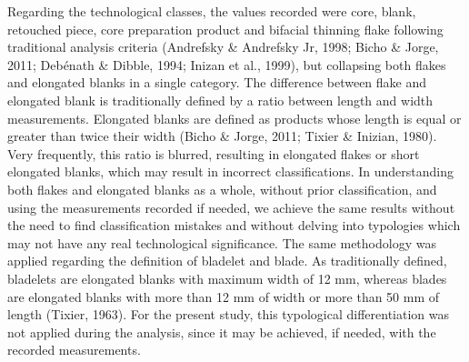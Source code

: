 \documentclass[12pt,twoside]{reedthesis}
\begin{document}
Regarding the technological classes, the values recorded were core, blank, retouched piece, core preparation product and bifacial thinning flake following traditional analysis criteria (Andrefsky \& Andrefsky Jr, 1998; Bicho \& Jorge, 2011; Debénath \& Dibble, 1994; Inizan et al., 1999), but collapsing both flakes and elongated blanks in a single category. The difference between flake and elongated blank is traditionally defined by a ratio between length and width measurements. Elongated blanks are defined as products whose length is equal or greater than twice their width (Bicho \& Jorge, 2011; Tixier \& Inizian, 1980). Very frequently, this ratio is blurred, resulting in elongated flakes or short elongated blanks, which may result in incorrect classifications. In understanding both flakes and elongated blanks as a whole, without prior classification, and using the measurements recorded if needed, we achieve the same results without the need to find classification mistakes and without delving into typologies which may not have any real technological significance. The same methodology was applied regarding the definition of bladelet and blade. As traditionally defined, bladelets are elongated blanks with maximum width of 12 mm, whereas blades are elongated blanks with more than 12 mm of width or more than 50 mm of length (Tixier, 1963). For the present study, this typological differentiation was not applied during the analysis, since it may be achieved, if needed, with the recorded measurements.
\end{document}
